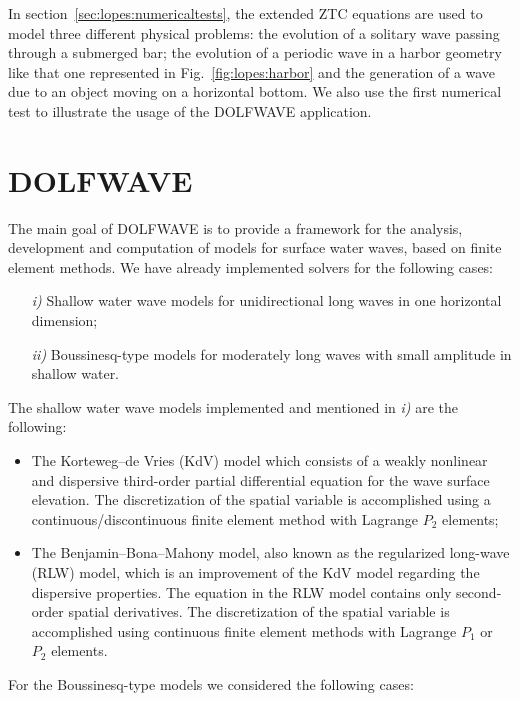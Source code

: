 In section~\ref{sec:lopes:numericaltests}, the extended ZTC
equations are used to model three different physical
problems: the evolution of a solitary wave passing through a
submerged bar; the evolution of a periodic wave in a harbor
geometry like that one represented in
Fig.~\ref{fig:lopes:harbor} and the generation of a wave due
to an object moving on a horizontal bottom.  We also use the
first numerical test to illustrate the usage of the DOLFWAVE
application.

\section{DOLFWAVE}\label{sec:lopes:dolfwave}
The main goal of DOLFWAVE is to provide a framework for the
analysis, development and computation of models for surface
water waves, based on finite element methods.  We have
already implemented solvers for the following cases:
\begin{itemize}
\item[{\it i)}] Shallow water wave models for unidirectional
  long waves in one horizontal dimension;
\item[{\it ii)}] Boussinesq-type models for moderately long
  waves with small amplitude in shallow water.
\end{itemize}
The shallow water wave models implemented and mentioned in {\it i)} are the following:
\begin{itemize}
\item The Korteweg--de Vries (KdV) model which consists of a
  weakly nonlinear and dispersive third-order partial
  differential equation for the wave surface elevation. The
  discretization of the spatial variable is accomplished
  using a continuous/discontinuous finite element method
  with Lagrange $P_2$ elements;

\item The Benjamin--Bona--Mahony model, also known as the
  regularized long-wave (RLW) model, which is an improvement
  of the KdV model regarding the dispersive properties.  The
  equation in the RLW model contains only second-order
  spatial derivatives. The discretization of the
  spatial variable is accomplished using continuous finite
  element methods with Lagrange $P_1$ or $P_2$ elements.
\end{itemize}
For the Boussinesq-type models we considered the following
cases:
